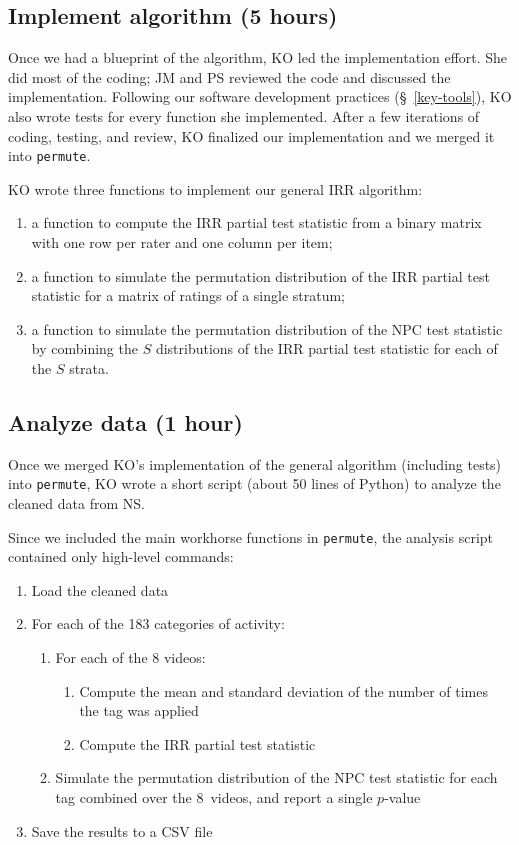 \documentclass[]{article}
\begin{document}
\subsection{Implement algorithm (5 hours)}

Once we had a blueprint of the algorithm, KO led the implementation effort.
She did most of the coding; JM and PS reviewed the code and discussed the
implementation.
Following our software development practices (\S~\ref{key-tools}), KO also
wrote tests for every function she implemented.
After a few iterations of coding, testing, and review, KO finalized our implementation
and we merged it into \texttt{permute}.

KO wrote three functions to implement our general IRR algorithm:
\begin{enumerate}
    \item a function to compute the IRR partial test statistic from a binary
      matrix with one row per rater and one column per item;
    \item a function to simulate the permutation distribution of the IRR partial
      test statistic for a matrix of ratings of a single stratum;
    \item a function to simulate the permutation distribution of the NPC
      test statistic by combining the $S$ distributions of the IRR partial test 
      statistic for each of the $S$ strata.
\end{enumerate}

\subsection{Analyze data (1 hour)}

Once we merged KO's implementation of the general algorithm (including tests)
into \texttt{permute}, KO wrote a short script (about 50 lines of Python) to
analyze the cleaned data from NS.

Since we included the main workhorse functions in \texttt{permute}, 
the analysis script contained only high-level commands:
\begin{enumerate}
\item Load the cleaned data
\item For each of the 183 categories of activity:
  \begin{enumerate}
    \item For each of the 8 videos:
    \begin{enumerate}
      \item Compute the mean and standard deviation of the number of times the
        tag was applied
      \item Compute the IRR partial test statistic
    \end{enumerate}
    \item Simulate the permutation distribution of the NPC test statistic for each
          tag combined over the $8$~videos, and report a single $p$-value
  \end{enumerate}
\item Save the results to a CSV file
\end{enumerate}
\end{document}
